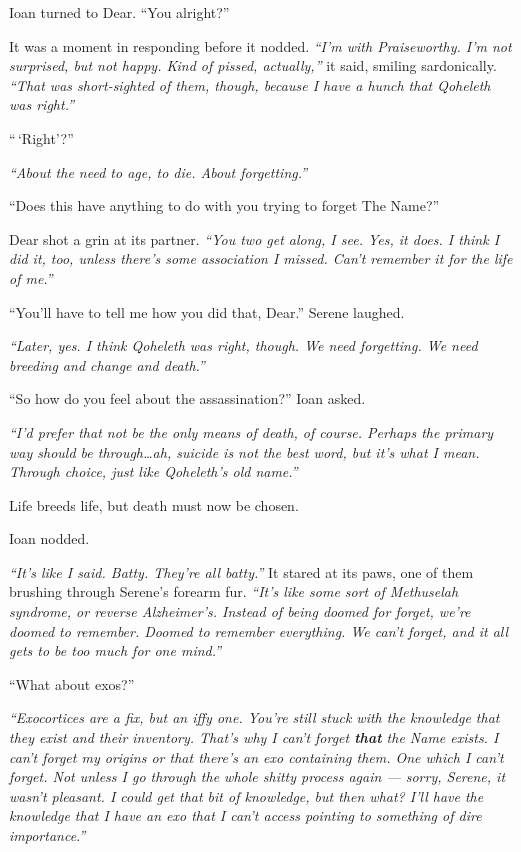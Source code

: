 Ioan turned to Dear. ``You alright?''

It was a moment in responding before it nodded. \emph{``I'm with Praiseworthy. I'm not surprised, but not happy. Kind of pissed, actually,''} it said, smiling sardonically. \emph{``That was short-sighted of them, though, because I have a hunch that Qoheleth was right.''}

``\,`Right'?''

\emph{``About the need to age, to die. About forgetting.''}

``Does this have anything to do with you trying to forget The Name?''

Dear shot a grin at its partner. \emph{``You two get along, I see. Yes, it does. I think I did it, too, unless there's some association I missed. Can't remember it for the life of me.''}

``You'll have to tell me how you did that, Dear.'' Serene laughed.

\emph{``Later, yes. I think Qoheleth was right, though. We need forgetting. We need breeding and change and death.''}

``So how do you feel about the assassination?'' Ioan asked.

\emph{``I'd prefer that not be the only means of death, of course. Perhaps the primary way should be through\ldots{}ah, suicide is not the best word, but it's what I mean. Through choice, just like Qoheleth's old name.''}

Life breeds life, but death must now be chosen.

Ioan nodded.

\emph{``It's like I said. Batty. They're all batty.''} It stared at its paws, one of them brushing through Serene's forearm fur. \emph{``It's like some sort of Methuselah syndrome, or reverse Alzheimer's. Instead of being doomed for forget, we're doomed to remember. Doomed to remember everything. We can't forget, and it all gets to be too much for one mind.''}

``What about exos?''

\emph{``Exocortices are a fix, but an iffy one. You're still stuck with the knowledge that they exist and their inventory. That's why I can't forget \textbf{that} the Name exists. I can't forget my origins or that there's an exo containing them. One which I can't forget. Not unless I go through the whole shitty process again — sorry, Serene, it wasn't pleasant. I could get that bit of knowledge, but then what? I'll have the knowledge that I have an exo that I can't access pointing to something of dire importance.''}

